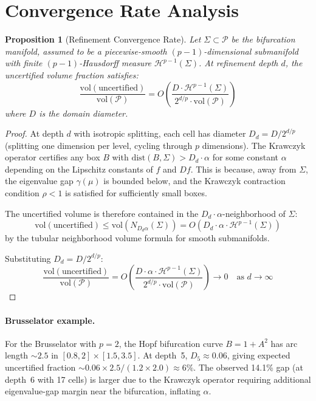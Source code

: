 \documentclass[11pt]{article}
\newtheorem{proposition}[theorem]{Proposition}
\begin{document}
\section{Convergence Rate Analysis}
\label{app:convergence}

\begin{proposition}[Refinement Convergence Rate]
\label{prop:convergence}
Let $\Sigma \subset \mathcal{P}$ be the bifurcation manifold, assumed to be a piecewise-smooth $(p{-}1)$-dimensional submanifold with finite $(p{-}1)$-Hausdorff measure $\mathcal{H}^{p-1}(\Sigma)$.
At refinement depth $d$, the uncertified volume fraction satisfies:
\[
\frac{\mathrm{vol}(\text{uncertified})}{\mathrm{vol}(\mathcal{P})} = O\!\left(\frac{D \cdot \mathcal{H}^{p-1}(\Sigma)}{2^{d/p} \cdot \mathrm{vol}(\mathcal{P})}\right)
\]
where $D$ is the domain diameter.
\end{proposition}

\begin{proof}
At depth $d$ with isotropic splitting, each cell has diameter $D_d = D / 2^{d/p}$ (splitting one dimension per level, cycling through $p$ dimensions).
The Krawczyk operator certifies any box $B$ with $\mathrm{dist}(B, \Sigma) > D_d \cdot \alpha$ for some constant $\alpha$ depending on the Lipschitz constants of $f$ and $Df$.
This is because, away from $\Sigma$, the eigenvalue gap $\gamma(\mu)$ is bounded below, and the Krawczyk contraction condition $\rho < 1$ is satisfied for sufficiently small boxes.

The uncertified volume is therefore contained in the $D_d \cdot \alpha$-neighborhood of $\Sigma$:
\[
\mathrm{vol}(\text{uncertified}) \leq \mathrm{vol}(N_{D_d \alpha}(\Sigma)) = O(D_d \cdot \alpha \cdot \mathcal{H}^{p-1}(\Sigma))
\]
by the tubular neighborhood volume formula for smooth submanifolds.

Substituting $D_d = D / 2^{d/p}$:
\[
\frac{\mathrm{vol}(\text{uncertified})}{\mathrm{vol}(\mathcal{P})} = O\!\left(\frac{D \cdot \alpha \cdot \mathcal{H}^{p-1}(\Sigma)}{2^{d/p} \cdot \mathrm{vol}(\mathcal{P})}\right) \to 0 \quad \text{as } d \to \infty
\]
\end{proof}

\paragraph{Brusselator example.}
For the Brusselator with $p=2$, the Hopf bifurcation curve $B = 1 + A^2$ has arc length $\sim 2.5$ in $[0.8, 2] \times [1.5, 3.5]$.
At depth~5, $D_5 \approx 0.06$, giving expected uncertified fraction $\sim 0.06 \times 2.5 / (1.2 \times 2.0) \approx 6\%$.
The observed 14.1\% gap (at depth~6 with 17 cells) is larger due to the Krawczyk operator requiring additional eigenvalue-gap margin near the bifurcation, inflating $\alpha$.
\end{document}
